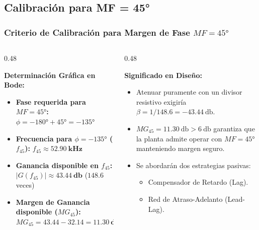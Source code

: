 \documentclass[aspectratio=169, 10pt]{beamer}
\begin{document}
\subsection{Calibración para MF = 45°}
\begin{frame}
  \frametitle{Criterio de Calibración para Margen de Fase $MF = \ang{45}$}

  \begin{columns}[c, onlytextwidth]
    \begin{column}{0.48\textwidth}
      \begin{tarjeta}[colframe=AlertGreen]
        {\fontsize{9pt}{11pt}\selectfont \textbf{\color{AlertGreen} Determinación Gráfica en Bode:}}\\[2pt]
        {\fontsize{8pt}{10pt}\selectfont
        \begin{itemize}\setlength{\itemsep}{2.5pt}
          \item \textbf{Fase requerida para $MF = \ang{45}$:}
          $\phi = \ang{-180} + \ang{45} = \mathbf{\ang{-135}}$
          \item \textbf{Frecuencia para $\phi = \ang{-135}$ ($f_{45}$):}
          $f_{45} \approx \mathbf{\qty{52.90}{\kilo\hertz}}$
          \item \textbf{Ganancia disponible en $f_{45}$:}
          $|G(f_{45})| \approx \mathbf{\qty{43.44}{\decibel}}$ ($148.6$ veces)
          \item \textbf{Margen de Ganancia disponible ($MG_{45}$):}
          $MG_{45} = 43.44 - 32.14 = \mathbf{11.30\ \unit{\decibel}} > \qty{6}{\decibel}$
        \end{itemize}
        }
      \end{tarjeta}
    \end{column}

    \begin{column}{0.48\textwidth}
      \begin{tarjeta}
        {\fontsize{9pt}{11pt}\selectfont \textbf{\color{NavyDark} Significado en Diseño:}}\\[2pt]
        {\fontsize{8pt}{10pt}\selectfont
        \begin{itemize}\setlength{\itemsep}{2.5pt}
          \item Atenuar puramente con un divisor resistivo exigiría $\beta = 1/148.6 = \qty{-43.44}{\decibel}$.
          \item $MG_{45} = \qty{11.30}{\decibel} > \qty{6}{\decibel}$ garantiza que la planta admite operar con $MF = \ang{45}$ manteniendo margen seguro.
          \item Se abordarán dos estrategias pasivas:
          \begin{itemize}\setlength{\itemsep}{1.5pt}
            \item Compensador de Retardo (Lag).
            \item Red de Atraso-Adelanto (Lead-Lag).
          \end{itemize}
        \end{itemize}
        }
      \end{tarjeta}
    \end{column}
  \end{columns}
\end{frame}
\end{document}
